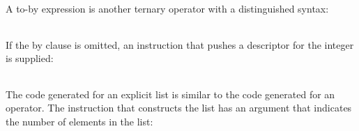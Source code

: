 \begin{noIndex}
\begin{center}
\begin{xtabular}{|m{1.9073598in}|m{2.75596in}|}
\end{xtabular}
\end{center}

A to-by expression is another ternary operator with a distinguished syntax:

\begin{center}
\tablelasttail{\hline}
\begin{xtabular}{|m{1.9073598in}|m{2.75596in}|}

\end{xtabular}
\end{center}

If the by clause is omitted, an instruction that pushes a descriptor
for the integer is supplied:

\begin{center}
\tablelasttail{\hline}
\begin{xtabular}{|m{1.9073598in}|m{2.75596in}|}

\end{xtabular}
\end{center}

The code generated for an explicit list is similar to the code
generated for an operator. The instruction that constructs the list
has an argument that indicates the number of elements in the list:

\begin{center}
\tablelasttail{\hline}
\begin{xtabular}{|m{1.9073598in}|m{2.75596in}|}


\end{xtabular}
\end{center}
\end{noIndex}
